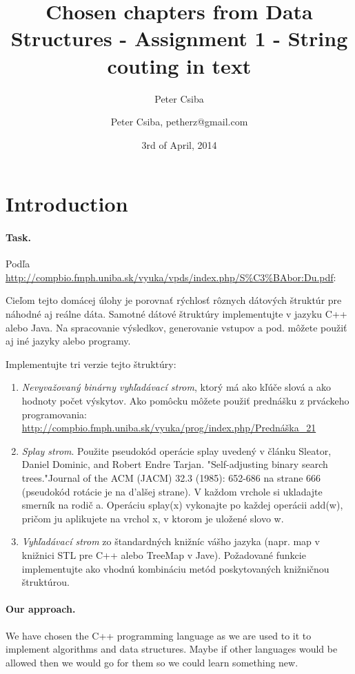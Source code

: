 \documentclass[12pt,a4paper]{article}
\author{Peter Csiba}
\title{Chosen chapters from Data Structures - Assignment 1 - String couting in text}
\date{3rd of April, 2014}
\author{Peter Csiba, petherz@gmail.com}
\begin{document}
\maketitle

\section*{Introduction}

\paragraph{Task.}
Podľa \url{http://compbio.fmph.uniba.sk/vyuka/vpds/index.php/S\%C3\%BAbor:Du.pdf}:

Cieľom tejto domácej úlohy je porovnať rýchlosť rôznych dátových štruktúr pre náhodné aj
reálne dáta. Samotné dátové štruktúry implementujte v jazyku C++ alebo Java. Na spracovanie
výsledkov, generovanie vstupov a pod. môžete použiť aj iné jazyky alebo programy.

Implementujte tri verzie tejto štruktúry:
\begin{enumerate} 
\item \emph{Nevyvažovaný binárny vyhľadávací strom}, ktorý má ako kľúče slová a ako hodnoty počet výskytov. Ako pomôcku môžete použiť prednášku z prváckeho programovania: \url{http://compbio.fmph.uniba.sk/vyuka/prog/index.php/Prednáška_21} 
\item \emph{Splay strom}. Použite pseudokód operácie splay uvedený v článku Sleator, Daniel Dominic, and Robert Endre Tarjan. "Self-adjusting binary search trees."Journal of the ACM (JACM) 32.3 (1985): 652-686 na strane 666 (pseudokód rotácie je na d’alšej strane). V každom vrchole si ukladajte smerník na rodič a. Operáciu splay(x) vykonajte po každej operácii add(w), pričom ju aplikujete na vrchol x, v ktorom je uložené slovo w.
\item \emph{Vyhľadávací strom} zo štandardných knižníc vášho jazyka (napr. map v knižnici STL pre C++ alebo TreeMap v Jave). Požadované funkcie implementujte ako vhodnú kombináciu metód poskytovaných knižničnou štruktúrou.
\end{enumerate} 

\paragraph{Our approach.} 
We have chosen the C++ programming language as we are used to it to implement algorithms and data structures. Maybe if other languages would be allowed then we would go for them so we could learn something new. 
\end{document}
